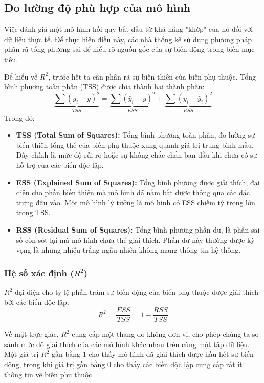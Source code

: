 \subsection{Đo lường độ phù hợp của mô hình}

Việc đánh giá một mô hình hồi quy bắt đầu từ khả năng "khớp" của nó đối với dữ liệu thực tế. Để thực hiện điều này, các nhà thống kê sử dụng phương pháp phân rã tổng phương sai để hiểu rõ nguồn gốc của sự biến động trong biến mục tiêu.

Để hiểu về $R^2$, trước hết ta cần phân rã sự biến thiên của biến phụ thuộc. Tổng bình phương toàn phần (TSS) được chia thành hai thành phần:
\begin{equation}
    \underbrace{\sum (y_i - \bar{y})^2}_{TSS} = \underbrace{\sum (\hat{y}_i - \bar{y})^2}_{ESS} + \underbrace{\sum (y_i - \hat{y}_i)^2}_{RSS}
\end{equation}
Trong đó:
\begin{itemize}
    \item \textbf{TSS (Total Sum of Squares):} Tổng bình phương toàn phần, đo lường sự biến thiên tổng thể của biến phụ thuộc xung quanh giá trị trung bình mẫu. Đây chính là mức độ rủi ro hoặc sự không chắc chắn ban đầu khi chưa có sự hỗ trợ của các biến độc lập.
    \item \textbf{ESS (Explained Sum of Squares):} Tổng bình phương được giải thích, đại diện cho phần biến thiên mà mô hình đã nắm bắt được thông qua các đặc trưng đầu vào. Một mô hình lý tưởng là mô hình có ESS chiếm tỷ trọng lớn trong TSS.
    \item \textbf{RSS (Residual Sum of Squares):} Tổng bình phương phần dư, là phần sai số còn sót lại mà mô hình chưa thể giải thích. Phần dư này thường được kỳ vọng là những nhiễu trắng ngẫu nhiên không mang thông tin hệ thống.
\end{itemize}

\subsubsection{Hệ số xác định ($R^2$)}
$R^2$ đại diện cho tỷ lệ phần trăm sự biến động của biến phụ thuộc được giải thích bởi các biến độc lập:
\begin{equation}
R^2 = \frac{ESS}{TSS} = 1 - \frac{RSS}{TSS}
\end{equation}

Về mặt trực giác, $R^2$ cung cấp một thang đo không đơn vị, cho phép chúng ta so sánh mức độ giải thích của các mô hình khác nhau trên cùng một tập dữ liệu. Một giá trị $R^2$ gần bằng 1 cho thấy mô hình đã giải thích được hầu hết sự biến động, trong khi giá trị gần bằng 0 cho thấy các biến độc lập cung cấp rất ít thông tin về biến phụ thuộc.

